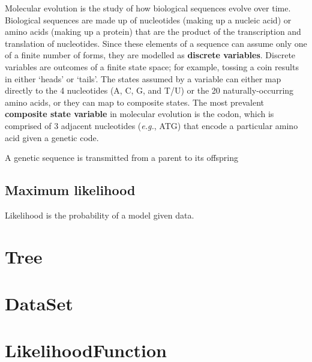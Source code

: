 \documentclass[12pt,twoside,openright]{book}
\begin{document}
Molecular evolution is the study of how biological sequences evolve over time.  Biological sequences are made up of nucleotides (making up a nucleic acid) or amino acids (making up a protein) that are the product of the transcription and translation of nucleotides.  Since these elements of a sequence can assume only one of a finite number of forms, they are modelled as \textbf{discrete variables}.  Discrete variables are outcomes of a finite state space; for example, tossing a coin results in either `heads' or `tails'.  The states assumed by a variable can either map directly to the 4 nucleotides (A, C, G, and T/U) or the 20 naturally-occurring amino acids, or they can map to composite states.  The most prevalent \textbf{composite state variable} in molecular evolution is the codon, which is comprised of 3 adjacent nucleotides ({\it e.g.}, ATG) that encode a particular amino acid given a genetic code.  

A genetic sequence is transmitted from a parent to its offspring 


\section {Maximum likelihood}

Likelihood is the probability of a model given data.  

\chapter {Tree}


\chapter {DataSet}

\chapter {LikelihoodFunction}
\end{document}

